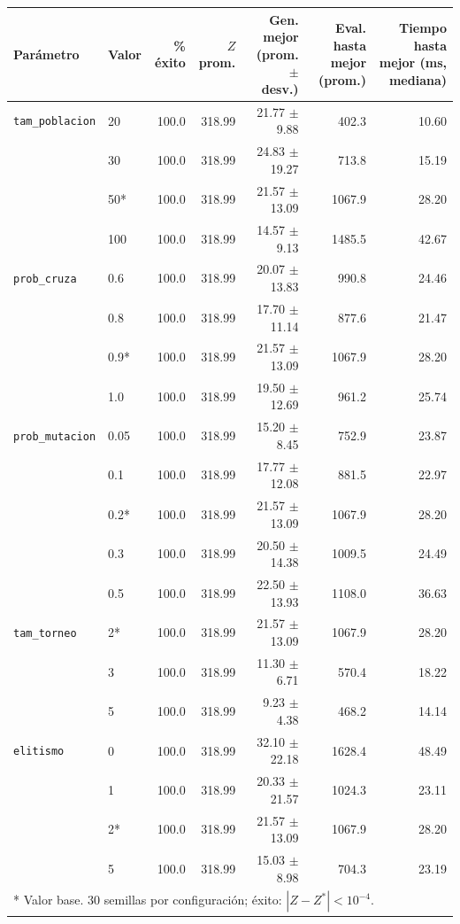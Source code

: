 \begin{tabular}{llrrrrr}
\toprule
Parámetro & Valor & \% éxito & $Z$ prom. & Gen. mejor (prom. $\pm$ desv.) & Eval. hasta mejor (prom.) & Tiempo hasta mejor (ms, mediana) \\
\midrule
\texttt{tam\_poblacion} & 20 & 100.0 & 318.99 & 21.77 $\pm$ 9.88 & 402.3 & 10.60 \\
 & 30 & 100.0 & 318.99 & 24.83 $\pm$ 19.27 & 713.8 & 15.19 \\
 & 50* & 100.0 & 318.99 & 21.57 $\pm$ 13.09 & 1067.9 & 28.20 \\
 & 100 & 100.0 & 318.99 & 14.57 $\pm$ 9.13 & 1485.5 & 42.67 \\
\midrule
\texttt{prob\_cruza} & 0.6 & 100.0 & 318.99 & 20.07 $\pm$ 13.83 & 990.8 & 24.46 \\
 & 0.8 & 100.0 & 318.99 & 17.70 $\pm$ 11.14 & 877.6 & 21.47 \\
 & 0.9* & 100.0 & 318.99 & 21.57 $\pm$ 13.09 & 1067.9 & 28.20 \\
 & 1.0 & 100.0 & 318.99 & 19.50 $\pm$ 12.69 & 961.2 & 25.74 \\
\midrule
\texttt{prob\_mutacion} & 0.05 & 100.0 & 318.99 & 15.20 $\pm$ 8.45 & 752.9 & 23.87 \\
 & 0.1 & 100.0 & 318.99 & 17.77 $\pm$ 12.08 & 881.5 & 22.97 \\
 & 0.2* & 100.0 & 318.99 & 21.57 $\pm$ 13.09 & 1067.9 & 28.20 \\
 & 0.3 & 100.0 & 318.99 & 20.50 $\pm$ 14.38 & 1009.5 & 24.49 \\
 & 0.5 & 100.0 & 318.99 & 22.50 $\pm$ 13.93 & 1108.0 & 36.63 \\
\midrule
\texttt{tam\_torneo} & 2* & 100.0 & 318.99 & 21.57 $\pm$ 13.09 & 1067.9 & 28.20 \\
 & 3 & 100.0 & 318.99 & 11.30 $\pm$ 6.71 & 570.4 & 18.22 \\
 & 5 & 100.0 & 318.99 & 9.23 $\pm$ 4.38 & 468.2 & 14.14 \\
\midrule
\texttt{elitismo} & 0 & 100.0 & 318.99 & 32.10 $\pm$ 22.18 & 1628.4 & 48.49 \\
 & 1 & 100.0 & 318.99 & 20.33 $\pm$ 21.57 & 1024.3 & 23.11 \\
 & 2* & 100.0 & 318.99 & 21.57 $\pm$ 13.09 & 1067.9 & 28.20 \\
 & 5 & 100.0 & 318.99 & 15.03 $\pm$ 8.98 & 704.3 & 23.19 \\
\midrule
\multicolumn{7}{l}{* Valor base. 30 semillas por configuración; éxito: $|Z - Z^*| < 10^{-4}$.} \\
\bottomrule
\end{tabular}
